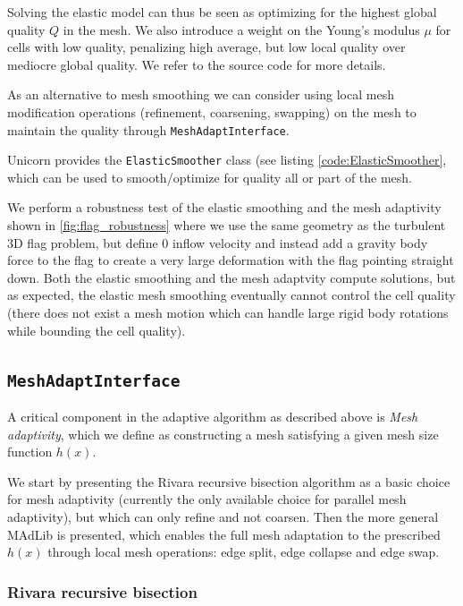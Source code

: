 Solving the elastic model can thus be seen as optimizing for the
highest global quality $Q$ in the mesh. We also introduce a weight on
the Young's modulus $\mu$ for cells with low quality, penalizing high
average, but low local quality over mediocre global quality. We refer
to the source code for more details.

As an alternative to mesh smoothing we can consider using local mesh
modification operations (refinement, coarsening, swapping) on the mesh
to maintain the quality \cite{CompereHoffmanEtAl2009}
through {\tt MeshAdaptInterface}.

Unicorn provides the {\tt ElasticSmoother} class (see
listing \ref{code:ElasticSmoother}, which can be used to
smooth/optimize for quality all or part of the mesh.

We perform a robustness test of the elastic smoothing and the mesh
adaptivity shown in \ref{fig:flag_robustness} where we use the same
geometry as the turbulent 3D flag problem, but define 0 inflow
velocity and instead add a gravity body force to the flag to create a
very large deformation with the flag pointing straight down. Both the
elastic smoothing and the mesh adaptvity compute solutions, but as
expected, the elastic mesh smoothing eventually cannot control the
cell quality (there does not exist a mesh motion which can handle
large rigid body rotations while bounding the cell quality).

\subsection{\tt MeshAdaptInterface}

A critical component in the adaptive algorithm as described above is
{\em Mesh adaptivity}, which we define as constructing a mesh
satisfying a given mesh size function $h(x)$.

We start by presenting the Rivara recursive bisection
algorithm \cite{Rivara1992} as a basic choice for mesh adaptivity
(currently the only available choice for parallel mesh adaptivity),
but which can only refine and not coarsen. Then the more general
MAdLib is presented, which enables the full mesh adaptation to the
prescribed $h(x)$ through local mesh operations: edge split, edge
collapse and edge swap.

\subsubsection{Rivara recursive bisection}

